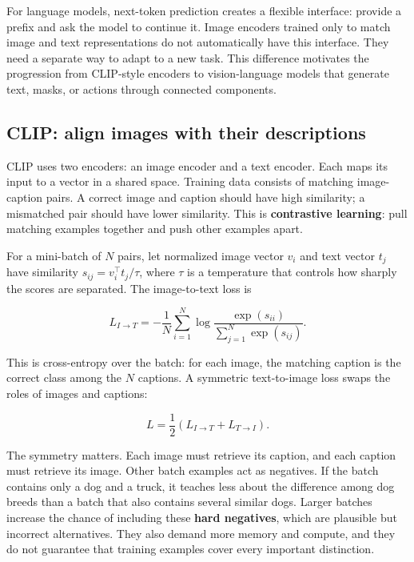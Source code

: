 For language models, next-token prediction creates a flexible interface: provide a prefix and ask the model to continue it. Image encoders trained only to match image and text representations do not automatically have this interface. They need a separate way to adapt to a new task. This difference motivates the progression from CLIP-style encoders to vision-language models that generate text, masks, or actions through connected components.

\subsection{CLIP: align images with their descriptions}\label{04-visual-computing-ii-ch031-clip-align-images-with-their-descriptions}

\hypertarget{04-visual-computing-ii-ch031-clip-align-images-with-their-descriptions}{}

CLIP uses two encoders: an image encoder and a text encoder. Each maps its input to a vector in a shared space. Training data consists of matching image-caption pairs. A correct image and caption should have high similarity; a mismatched pair should have lower similarity. This is \textbf{contrastive learning}: pull matching examples together and push other examples apart.

For a mini-batch of \(N\) pairs, let normalized image vector \(v_i\) and text vector \(t_j\) have similarity \(s_{ij}=v_i^\top t_j/\tau\), where \(\tau\) is a temperature that controls how sharply the scores are separated. The image-to-text loss is

\[
L_{I\to T}=-\frac{1}{N}\sum_{i=1}^{N}\log\frac{\exp(s_{ii})}{\sum_{j=1}^{N}\exp(s_{ij})}.
\]

This is cross-entropy over the batch: for each image, the matching caption is the correct class among the \(N\) captions. A symmetric text-to-image loss swaps the roles of images and captions:

\[
L=\frac{1}{2}(L_{I\to T}+L_{T\to I}).
\]

The symmetry matters. Each image must retrieve its caption, and each caption must retrieve its image. Other batch examples act as negatives. If the batch contains only a dog and a truck, it teaches less about the difference among dog breeds than a batch that also contains several similar dogs. Larger batches increase the chance of including these \textbf{hard negatives}, which are plausible but incorrect alternatives. They also demand more memory and compute, and they do not guarantee that training examples cover every important distinction.

